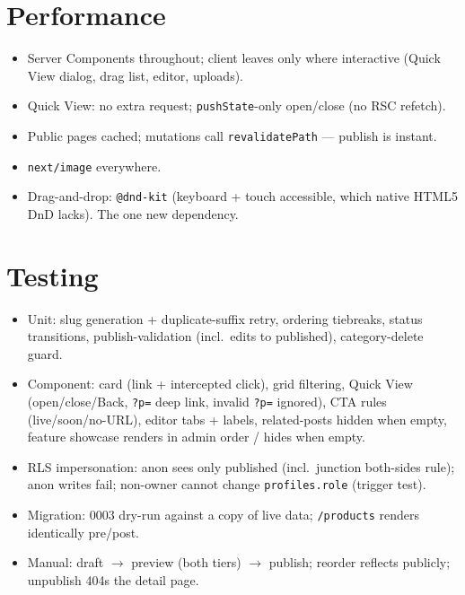 \documentclass[11pt,a4paper]{article}
\begin{document}
\section{Performance}
\begin{itemize}
  \item Server Components throughout; client leaves only where interactive (Quick View
        dialog, drag list, editor, uploads).
  \item Quick View: no extra request; \texttt{pushState}-only open/close (no RSC refetch).
  \item Public pages cached; mutations call \texttt{revalidatePath} --- publish is instant.
  \item \texttt{next/image} everywhere.
  \item Drag-and-drop: \texttt{@dnd-kit} (keyboard + touch accessible, which native HTML5
        DnD lacks). The one new dependency.
\end{itemize}

\section{Testing}
\begin{itemize}
  \item Unit: slug generation + duplicate-suffix retry, ordering tiebreaks, status
        transitions, publish-validation (incl.\ edits to published), category-delete guard.
  \item Component: card (link + intercepted click), grid filtering, Quick View
        (open/close/Back, \texttt{?p=} deep link, invalid \texttt{?p=} ignored), CTA rules
        (live/soon/no-URL), editor tabs + labels, related-posts hidden when empty, feature
        showcase renders in admin order / hides when empty.
  \item RLS impersonation: anon sees only published (incl.\ junction both-sides rule); anon
        writes fail; non-owner cannot change \texttt{profiles.role} (trigger test).
  \item Migration: 0003 dry-run against a copy of live data; \texttt{/products} renders
        identically pre/post.
  \item Manual: draft $\rightarrow$ preview (both tiers) $\rightarrow$ publish; reorder
        reflects publicly; unpublish 404s the detail page.
\end{itemize}
\end{document}
